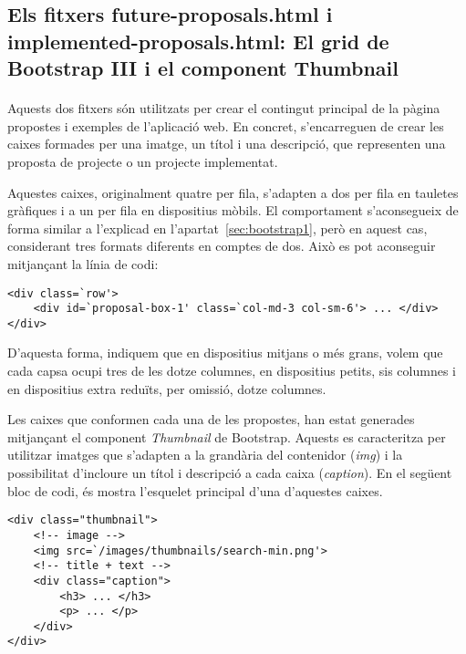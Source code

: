 \subsection{Els fitxers future-proposals.html i implemented-proposals.html: El grid de Bootstrap III i el component Thumbnail}

    \paragraph{}
    Aquests dos fitxers són utilitzats per crear el contingut principal de la pàgina propostes i exemples de l'aplicació web. En concret, s'encarreguen de crear les caixes formades per una imatge, un títol i una descripció, que representen una proposta de projecte o un projecte implementat.

    Aquestes caixes, originalment quatre per fila, s'adapten a dos per fila en tauletes gràfiques i a un per fila en dispositius mòbils. El comportament s'aconsegueix de forma similar a l'explicad en l'apartat~\ref{sec:bootstrap1}, però en aquest cas, considerant tres formats diferents en comptes de dos. Això es pot aconseguir mitjançant la línia de codi:

    \begin{lstlisting}[style=rawOwn,caption={Multiples configuracions en un bloc de columnes}]
<div class=`row'>
    <div id=`proposal-box-1' class=`col-md-3 col-sm-6'> ... </div>
</div>
    \end{lstlisting}

    D'aquesta forma, indiquem que en dispositius mitjans o més grans, volem que cada capsa ocupi tres de les dotze columnes, en dispositius petits, sis columnes i en dispositius extra reduïts, per omissió, dotze columnes.

    Les caixes que conformen cada una de les propostes, han estat generades mitjançant el component \emph{Thumbnail} de Bootstrap. Aquests es caracteritza per utilitzar imatges que s'adapten a la grandària del contenidor (\emph{img}) i la possibilitat d'incloure un títol i descripció a cada caixa (\emph{caption}). En el següent bloc de codi, és mostra l'esquelet principal d'una d'aquestes caixes.

    \begin{lstlisting}[style=rawOwn,caption={Exemple de Bootstrap Thumbnail}]
<div class="thumbnail">
    <!-- image -->
    <img src=`/images/thumbnails/search-min.png'>
    <!-- title + text -->
    <div class="caption">
        <h3> ... </h3>
        <p> ... </p>
    </div>
</div>
    \end{lstlisting}
